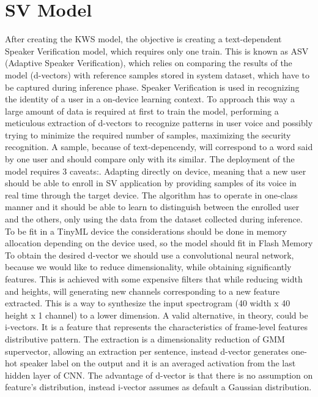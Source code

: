 \section{SV Model}
\label{sec:sv introduction}
After creating the KWS model, the objective is creating a text-dependent Speaker Verification model, which requires only one train. This is known as ASV (Adaptive Speaker Verification), which relies on comparing the results of the model (d-vectors) with reference samples stored in system dataset, which have to be captured during inference phase. Speaker Verification is used in recognizing the identity of a user in a on-device learning context. To approach this way a large amount of data is required at first to train the model, performing a meticulous extraction of d-vectors to recognize patterns in user voice and possibly trying to minimize the required number of samples, maximizing the security recognition. A sample, because of text-depencendy, will correspond to a word said by one user and should compare only with its similar.\newline
The deployment of the model requires 3 caveats:. Adapting directly on device, meaning that a new user should be able to enroll in SV application by providing samples of its voice in real time through the target device. The algorithm has to operate in one-class manner and it should be able to learn to distinguish between the enrolled user and the others, only using the data from the dataset collected during inference. To be fit in a TinyML device the considerations should be done in memory allocation depending on the device used, so the model should fit in Flash Memory\newline
To obtain the desired d-vector we should use a convolutional neural network, because we would like to reduce dimensionality, while obtaining significantly features. This is achieved with some expensive filters that while reducing width and heights, will generating new channels corresponding to a new feature extracted. This is a way to synthesize the input spectrogram (40 width x 40 height x 1 channel) to a lower dimension.\newline
A valid alternative, in theory, could be i-vectors. It is a feature that represents the characteristics of frame-level features distributive pattern. The extraction is a dimensionality reduction of GMM supervector, allowing an extraction per sentence, instead d-vector generates one-hot speaker label on the output and it is an averaged activation from the last hidden layer of CNN. The advantage of d-vector is that there is no assumption on feature's distribution, instead i-vector assumes as default a Gaussian distribution.

